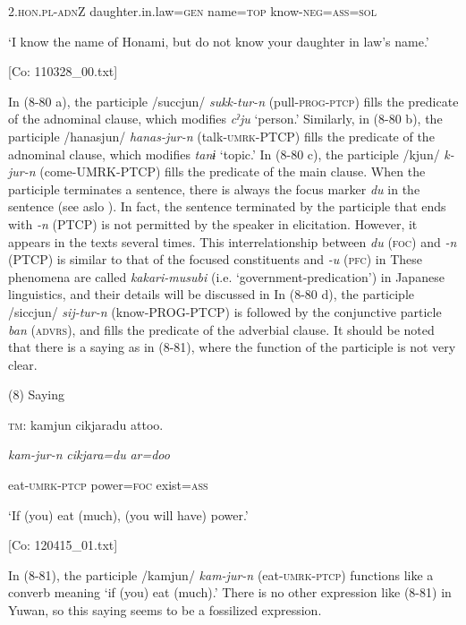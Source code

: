       2.\textsc{hon}.\textsc{pl}-\textsc{adn}Z  daughter.in.law=\textsc{gen}  name=\textsc{top}  know-\textsc{neg}=\textsc{ass}=\textsc{sol}

      ‘I know the name of Honami, but do not know your daughter in law’s name.’

      [Co: 110328\_00.txt]

In (8-80 a), the participle /succjun/ \textit{sukk-tur-n} (pull-\textsc{prog}-\textsc{ptcp}) fills the predicate of the adnominal clause, which modifies \textit{cˀju} ‘person.’ Similarly, in (8-80 b), the participle /hanasjun/ \textit{hanas-jur-n} (talk-\textsc{umrk}-PTCP) fills the predicate of the adnominal clause, which modifies \textit{tanɨ} ‘topic.’ In (8-80 c), the participle /kjun/ \textit{k-jur-n} (come-UMRK-PTCP) fills the predicate of the main clause. When the participle terminates a sentence, there is always the focus marker \textit{du} in the sentence (see aslo ). In fact, the sentence terminated by the participle that ends with \textit{{}-n} (PTCP) is not permitted by the speaker in elicitation. However, it appears in the texts several times. This interrelationship between \textit{du} (\textsc{foc}) and \textit{{}-n} (PTCP) is similar to that of the focused constituents and \textit{-u} (\textsc{pfc}) in  These phenomena are called \textit{kakari-musubi} (i.e. ‘government-predication’) in Japanese linguistics, and their details will be discussed in  In (8-80 d), the participle /siccjun/ \textit{sij-tur-n} (know-PROG-PTCP) is followed by the conjunctive particle \textit{ban} (\textsc{advrs}), and fills the predicate of the adverbial clause. It should be noted that there is a saying as in (8-81), where the function of the participle is not very clear.

(8)  Saying

  \textsc{tm}:  kamjun  cikjaradu  attoo.

    \textit{kam-jur-n}  \textit{cikjara=du}  \textit{ar=doo}

    eat-\textsc{umrk}-\textsc{ptcp}  power=\textsc{foc}  exist=\textsc{ass}

    ‘If (you) eat (much), (you will have) power.’

    [Co: 120415\_01.txt]

In (8-81), the participle /kamjun/ \textit{kam-jur-n} (eat-\textsc{umrk}-\textsc{ptcp}) functions like a converb meaning ‘if (you) eat (much).’ There is no other expression like (8-81) in Yuwan, so this saying seems to be a fossilized expression.

